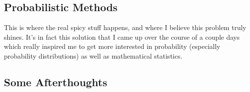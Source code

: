 \subsection{Probabilistic Methods}


This is where the real spicy stuff happens, and where I believe this problem
truly shines. It's in fact this solution that I came up over the course of a
couple days which really inspired me to get more interested in probability
 (especially
probability distributions) as well as mathematical statistics.




\subsection{Some Afterthoughts}


